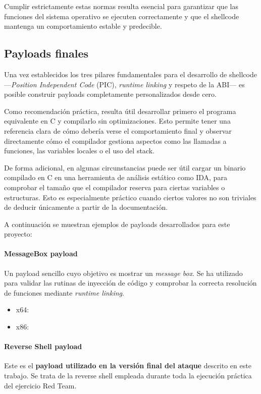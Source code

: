 Cumplir estrictamente estas normas resulta esencial para garantizar que las funciones del sistema operativo se ejecuten correctamente y que el shellcode mantenga un comportamiento estable y predecible.

\subsection{Payloads finales}

Una vez establecidos los tres pilares fundamentales para el desarrollo de shellcode —\textit{Position Independent Code} (PIC), \textit{runtime linking} y respeto de la ABI— es posible construir payloads completamente personalizados desde cero.

Como recomendación práctica, resulta útil desarrollar primero el programa equivalente en C y compilarlo sin optimizaciones. Esto permite tener una referencia clara de cómo debería verse el comportamiento final y observar directamente cómo el compilador gestiona aspectos como las llamadas a funciones, las variables locales o el uso del stack.

De forma adicional, en algunas circunstancias puede ser útil cargar un binario compilado en C en una herramienta de análisis estático como IDA, para comprobar el tamaño que el compilador reserva para ciertas variables o estructuras. Esto es especialmente práctico cuando ciertos valores no son triviales de deducir únicamente a partir de la documentación.

A continuación se muestran ejemplos de payloads desarrollados para este proyecto:

\paragraph{MessageBox payload}  
Un payload sencillo cuyo objetivo es mostrar un \textit{message box}. Se ha utilizado para validar las rutinas de inyección de código y comprobar la correcta resolución de funciones mediante \textit{runtime linking}.

\begin{itemize}
    \item x64: \cite{github-messagebox-x64}
    \item x86: \cite{github-messagebox-x86}
\end{itemize}

\paragraph{Reverse Shell payload}
Este es el \textbf{payload utilizado en la versión final del ataque} descrito en este trabajo. Se trata de la reverse shell empleada durante toda la ejecución práctica del ejercicio Red Team.

